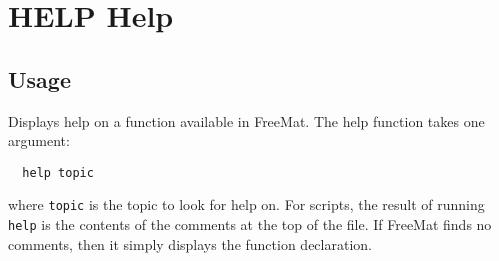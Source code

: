 \section{HELP Help}

\subsection{Usage}

Displays help on a function available in FreeMat.  The help function
takes one argument:
\begin{verbatim}
  help topic
\end{verbatim}
where \verb|topic| is the topic to look for help on.  For scripts, the 
result of running \verb|help| is the contents of the comments at the top
of the file.  If FreeMat finds no comments, then it simply displays
the function declaration.
